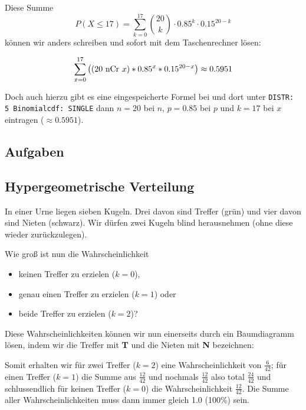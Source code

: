 Diese Summe
$$P(X\le 17) = \sum_{k=0}^{17} {20 \choose k} \cdot 0.85^k \cdot 0.15^{20-k}$$
können wir anders schreiben und sofort mit dem
Taschenrechner lösen:

$$\sum_{x=0}^{17}\left(( 20 \textrm{\,\,nCr\,\,} x ) * 0.85^x *
0.15^{20-x}\right) \approx 0.5951$$


Doch auch hierzu gibt es eine eingespeicherte Formel
bei
 und dort unter \texttt{DISTR: 5
  Binomialcdf: SINGLE} dann $n=20$ bei $n$, $p=0.85$ bei $p$ und
$k=17$ bei $x$ eintragen ($\approx 0.5951$).



\subsection*{Aufgaben}

\newpage



\subsection{Hypergeometrische Verteilung}
In einer Urne liegen sieben Kugeln. Drei davon sind Treffer (grün) und vier davon sind Nieten (schwarz).
Wir dürfen zwei Kugeln blind herausnehmen (ohne diese wieder zurückzulegen).


Wie groß ist nun die Wahrscheinlichkeit
\begin{itemize}
\item keinen Treffer zu erzielen ($k=0$),
\item genau einen Treffer zu erzielen ($k=1$) oder
\item beide Treffer zu erzielen ($k=2$)?
\end{itemize}

Diese Wahrscheinlichkeiten können wir nun einerseits durch ein Baumdiagramm lösen, indem wir die Treffer mit \textbf{\color{green}T} und die Nieten mit \textbf{\color{red}N} bezeichnen:


Somit erhalten wir für zwei Treffer ($k=2$) eine Wahrscheinlichkeit von $\frac{6}{42}$; für einen Treffer ($k=1$) die Summe aus $\frac{12}{42}$ und nochmals $\frac{12}{42}$ also total $\frac{24}{42}$ und schlussendlich für keinen Treffer ($k=0$) die Wahrscheinlichkeit $\frac{12}{42}$.
Die Summe aller Wahrscheinlichkeiten muss dann immer gleich 1.0 (100\%) sein.
\newpage



